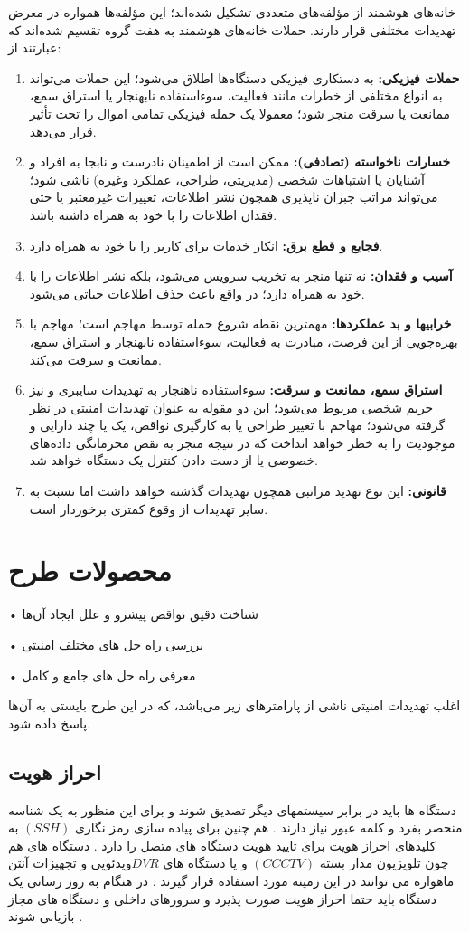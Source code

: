 \documentclass[aimcpersian]{aimc46}
\begin{document}
خانه‌های هوشمند از مؤلفه‌های متعددی تشکیل شده‌اند؛ این مؤلفه‌ها همواره در معرض تهدیدات مختلفی قرار دارند. حملات خانه‌های هوشمند به هفت گروه تقسیم شده‌اند که عبارتند از:
 \begin{enumerate}
 \item
\textbf{ 	حملات فیزیکی:} به دستکاری فیزیکی دستگاه‌ها اطلاق می‌شود؛ این حملات می‌تواند به انواع مختلفی از خطرات مانند فعالیت، سوءاستفاده نابهنجار یا استراق سمع، ممانعت یا سرقت منجر شود؛ معمولا یک حمله فیزیکی تمامی اموال را تحت تأثیر قرار می‌دهد.
 \item
 \textbf{	خسارات ناخواسته (تصادفی): }ممکن است از اطمینان نادرست و نابجا به افراد و آشنایان یا اشتباهات شخصی (مدیریتی، طراحی، عملکرد وغیره) ناشی شود؛ می‌تواند مراتب جبران ناپذیری همچون نشر اطلاعات، تغییرات غیرمعتبر یا حتی فقدان اطلاعات را با خود به همراه داشته باشد. 
 \item
 \textbf{	فجایع و قطع برق:} انکار خدمات برای کاربر را با خود به همراه دارد.
  \item
 \textbf{		آسیب  و فقدان:} نه تنها منجر به تخریب سرویس می‌شود، بلکه نشر اطلاعات را با خود به همراه دارد؛ در واقع باعث حذف اطلاعات حیاتی می‌شود.
 \item
 \textbf{		خرابیها و بد عملکردها:} مهمترین نقطه شروع حمله توسط مهاجم است؛ مهاجم با بهره‌جویی از این فرصت، مبادرت به فعالیت، سوءاستفاده نابهنجار و استراق سمع، ممانعت و سرقت می‌کند.
 \item
 \textbf{		استراق سمع، ممانعت و سرقت:} سوءاستفاده ناهنجار به تهدیدات سایبری و نیز حریم شخصی مربوط می‌شود؛ این دو مقوله به عنوان تهدیدات امنیتی در نظر گرفته می‌شود؛ مهاجم با تغییر طراحی یا به کارگیری نواقص، یک یا چند دارایی و موجودیت را به خطر خواهد انداخت که در نتیجه منجر به نقض محرمانگی داده‌های خصوصی یا از دست دادن کنترل یک دستگاه خواهد شد.
 \item
 \textbf{		قانونی:} این نوع تهدید مراتبی همچون تهدیدات گذشته خواهد داشت اما نسبت به سایر تهدیدات از وقوع کمتری برخوردار است.

\end{enumerate}
\newpage
\section{محصولات طرح}
•	شناخت دقیق نواقص پیشرو و علل ایجاد آن‌ها

•	بررسی راه حل های مختلف امنیتی

•	معرفی راه حل های جامع و کامل
 
اغلب تهدیدات امنیتی ناشی از پارامترهای زیر می‌باشد، که در این طرح بایستی به آن‌ها پاسخ داده شود.
\subsection{احراز هویت }
دستگاه ها باید در برابر سیستمهای دیگر تصدیق شوند و برای این منظور به یک شناسه منحصر بفرد و کلمه عبور نیاز دارند . هم چنین برای پیاده سازی رمز نگاری $(SSH)$ به کلیدهای احراز هویت برای تایید هویت دستگاه های متصل را دارد . دستگاه های هم چون تلویزیون مدار بسته $(CCCTV)$ و یا دستگاه های $DVR$ویدئویی و تجهیزات آنتن ماهواره می توانند در این زمینه مورد استفاده قرار گیرند . در هنگام به روز رسانی یک دستگاه باید حتما احراز هویت صورت پذیرد و سرورهای داخلی و دستگاه های مجاز بازیابی شوند .
\end{document}
